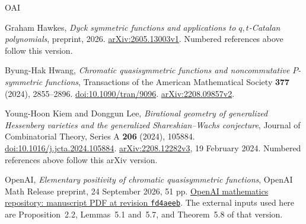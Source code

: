 \documentclass[11pt]{article}
\theoremstyle{remark}
\numberwithin{equation}{section}
\begin{document}
\begin{thebibliography}{OAI}

Graham Hawkes,
\emph{Dyck symmetric functions and applications to $q,t$-Catalan polynomials},
preprint, 2026.
\href{https://arxiv.org/abs/2605.13003v1}{arXiv:2605.13003v1}.
Numbered references above follow this version.

Byung-Hak Hwang,
\emph{Chromatic quasisymmetric functions and noncommutative
$P$-symmetric functions},
Transactions of the American Mathematical Society \textbf{377} (2024),
2855--2896.
\href{https://doi.org/10.1090/tran/9096}{doi:10.1090/tran/9096}.
\href{https://arxiv.org/abs/2208.09857v2}{arXiv:2208.09857v2}.

Young-Hoon Kiem and Donggun Lee,
\emph{Birational geometry of generalized Hessenberg varieties and the
generalized Shareshian--Wachs conjecture},
Journal of Combinatorial Theory, Series A \textbf{206} (2024), 105884.
\href{https://doi.org/10.1016/j.jcta.2024.105884}{doi:10.1016/j.jcta.2024.105884}.
\href{https://arxiv.org/abs/2208.12282v3}{arXiv:2208.12282v3},
19 February 2024. Numbered references above follow this arXiv version.

OpenAI,
\emph{Elementary positivity of chromatic quasisymmetric functions},
OpenAI Math Release preprint, 24 September 2026, 51 pp.
\href{https://github.com/openai/math/blob/fd4aeeb/preprints/Elementary-Positivity-of-Chromatic-Quasisymmetric-Functions-September-24-2026/paper.pdf}{OpenAI mathematics repository: manuscript PDF at revision \texttt{fd4aeeb}}.
The external inputs used here are Proposition~2.2, Lemmas~5.1 and~5.7,
and Theorem~5.8 of that version.

\end{thebibliography}
\end{document}
